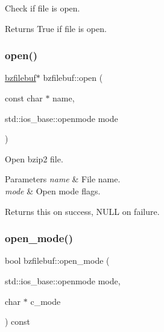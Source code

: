 Check if file is open. 

\begin{DoxyReturn}{Returns}
True if file is open. 
\end{DoxyReturn}
\mbox{\label{classbzfilebuf_a89ba3fdd6fd497f9165a2a3ea2d415d3}} 
\subsubsection{\texorpdfstring{open()}{open()}}
{\footnotesize\ttfamily \hyperlink{classbzfilebuf}{bzfilebuf}$\ast$ bzfilebuf\+::open (\begin{DoxyParamCaption}\item[{const char $\ast$}]{name,  }\item[{std\+::ios\+\_\+base\+::openmode}]{mode }\end{DoxyParamCaption})}



Open bzip2 file. 


\begin{DoxyParams}{Parameters}
{\em name} & File name. \\
\hline
{\em mode} & Open mode flags. \\
\hline
\end{DoxyParams}
\begin{DoxyReturn}{Returns}
{\ttfamily this} on success, N\+U\+LL on failure. 
\end{DoxyReturn}
\mbox{\label{classbzfilebuf_ac66986ba4c5da71eb693476fa1df6371}} 
\subsubsection{\texorpdfstring{open\+\_\+mode()}{open\_mode()}}
{\footnotesize\ttfamily bool bzfilebuf\+::open\+\_\+mode (\begin{DoxyParamCaption}\item[{std\+::ios\+\_\+base\+::openmode}]{mode,  }\item[{char $\ast$}]{c\+\_\+mode }\end{DoxyParamCaption}) const\hspace{0.3cm}{\ttfamily [protected]}}



